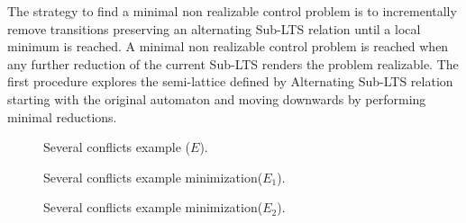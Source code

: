 
The strategy to find a minimal non realizable control problem is to incrementally remove transitions preserving an alternating Sub-LTS relation until a local minimum is reached.  A minimal non realizable control problem is reached when any further reduction of the current Sub-LTS renders the problem realizable.
The first procedure explores the semi-lattice defined by Alternating Sub-LTS relation starting with the original automaton and moving downwards by performing minimal reductions. 

\begin{figure}[bt]
	\centering
	\SmallPicture
	\caption{Several conflicts example ($E$).}
	\label{fig:fig.several-conflicts}
	\MediumPicture
\end{figure}

\begin{figure}[bt]
	\centering
	\SmallPicture
	\caption{Several conflicts example minimization($E_1$).}
	\label{fig:fig.several-conflicts-min1}
	\MediumPicture
\end{figure}

\begin{figure}[bt]
	\centering
	\SmallPicture
	\caption{Several conflicts example minimization($E_2$).}
	\label{fig:fig.several-conflicts-min2}
	\MediumPicture
\end{figure}

